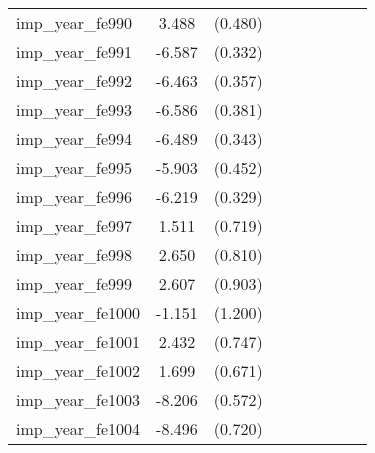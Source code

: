 {\begin{tabular}{l*{4}{cc}}
imp\_year\_fe990&    3.488\sym{***}&  (0.480)&                  &         &                  &         &                  &         \\
imp\_year\_fe991&   -6.587\sym{***}&  (0.332)&                  &         &                  &         &                  &         \\
imp\_year\_fe992&   -6.463\sym{***}&  (0.357)&                  &         &                  &         &                  &         \\
imp\_year\_fe993&   -6.586\sym{***}&  (0.381)&                  &         &                  &         &                  &         \\
imp\_year\_fe994&   -6.489\sym{***}&  (0.343)&                  &         &                  &         &                  &         \\
imp\_year\_fe995&   -5.903\sym{***}&  (0.452)&                  &         &                  &         &                  &         \\
imp\_year\_fe996&   -6.219\sym{***}&  (0.329)&                  &         &                  &         &                  &         \\
imp\_year\_fe997&    1.511\sym{*}  &  (0.719)&                  &         &                  &         &                  &         \\
imp\_year\_fe998&    2.650\sym{**} &  (0.810)&                  &         &                  &         &                  &         \\
imp\_year\_fe999&    2.607\sym{**} &  (0.903)&                  &         &                  &         &                  &         \\
imp\_year\_fe1000&   -1.151         &  (1.200)&                  &         &                  &         &                  &         \\
imp\_year\_fe1001&    2.432\sym{**} &  (0.747)&                  &         &                  &         &                  &         \\
imp\_year\_fe1002&    1.699\sym{*}  &  (0.671)&                  &         &                  &         &                  &         \\
imp\_year\_fe1003&   -8.206\sym{***}&  (0.572)&                  &         &                  &         &                  &         \\
imp\_year\_fe1004&   -8.496\sym{***}&  (0.720)&                  &         &                  &         &                  &         \\

\end{tabular}}

